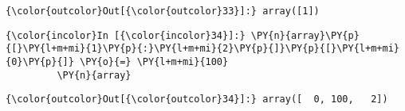 \begin{Verbatim}[commandchars=\\\{\}]
{\color{outcolor}Out[{\color{outcolor}33}]:} array([1])
\end{Verbatim}
            
    \begin{Verbatim}[commandchars=\\\{\}]
{\color{incolor}In [{\color{incolor}34}]:} \PY{n}{array}\PY{p}{[}\PY{l+m+mi}{1}\PY{p}{:}\PY{l+m+mi}{2}\PY{p}{]}\PY{p}{[}\PY{l+m+mi}{0}\PY{p}{]} \PY{o}{=} \PY{l+m+mi}{100}
         \PY{n}{array}
\end{Verbatim}


\begin{Verbatim}[commandchars=\\\{\}]
{\color{outcolor}Out[{\color{outcolor}34}]:} array([  0, 100,   2])
\end{Verbatim}
            

    
    
    
